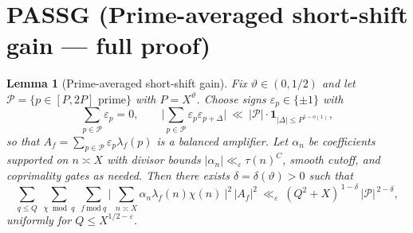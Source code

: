 \documentclass[11pt]{article}
\newtheorem{lemma}{Lemma}[part]
\theoremstyle{definition}
\theoremstyle{remark}
\numberwithin{equation}{part}
\begin{document}
\section{PASSG (Prime-averaged short-shift gain — full proof)}

\begin{lemma}[Prime-averaged short-shift gain]\label{lem:PASSG}
	Fix $\vartheta\in(0,1/2)$ and let $\mathcal P=\{p\in[P,2P]\text{ prime}\}$ with $P=X^\vartheta$.
	Choose signs $\varepsilon_p\in\{\pm1\}$ with
	\[
		\sum_{p\in\mathcal P}\varepsilon_p=0,
		\qquad
		\Big|\sum_{p\in\mathcal P}\varepsilon_p\varepsilon_{p+\Delta}\Big|
		\ \ll\ |\mathcal P|\cdot\mathbf1_{|\Delta|\le P^{1-o(1)}},
	\]
	so that $A_f=\sum_{p\in\mathcal P}\varepsilon_p\lambda_f(p)$ is a balanced amplifier.
	Let $\alpha_n$ be coefficients supported on $n\asymp X$ with divisor bounds $|\alpha_n|\ll_\varepsilon \tau(n)^C$, smooth cutoff, and coprimality gates as needed.
	Then there exists $\delta=\delta(\vartheta)>0$ such that
	\begin{equation}\label{eq:S2.4_goal}
		\sum_{q\le Q}\ \sum_{\chi\bmod q}\ \sum_{f\ \mathrm{mod}\ q}
		\Bigg|\ \sum_{n\asymp X}\alpha_n \lambda_f(n)\chi(n)\ \Bigg|^2\,|A_f|^2
		\ \ll_\varepsilon\ (Q^2+X)^{\,1-\delta}\,|\mathcal P|^{\,2-\delta},
	\end{equation}
	uniformly for $Q\le X^{1/2-\varepsilon}$.
\end{lemma}
\end{document}
